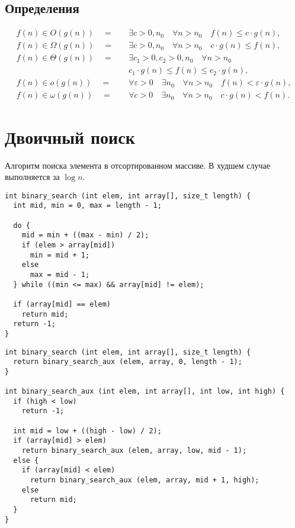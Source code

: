 \subsection{Определения}
\begin{align}
  f(n) \in O(g(n)) \quad = \quad &\exists c > 0, n_0 \quad \forall n > n_0 \quad f(n) \leq c \cdot g(n),\\
  f(n) \in \Omega(g(n)) \quad = \quad &\exists c > 0, n_0 \quad \forall n > n_0 \quad c \cdot g(n) \leq f(n),\\
  f(n) \in \Theta(g(n)) \quad = \quad &\exists c_1 > 0, c_2 > 0, n_0 \quad \forall n > n_0 \nonumber\\
                                      &c_1 \cdot g(n) \leq f(n) \leq c_2 \cdot g(n),\\
  f(n) \in o(g(n)) \quad = \quad &\forall \varepsilon > 0 \quad \exists n_0 \quad \forall n > n_0 \quad f(n) < \varepsilon \cdot g(n),\\
  f(n) \in \omega(g(n)) \quad = \quad &\forall c > 0 \quad \exists n_0 \quad \forall n > n_0 \quad c \cdot g(n) < f(n).
\end{align}

\section{Двоичный поиск}
\label{sec:binary-search}

Алгоритм поиска элемента в отсортированном массиве. В худшем случае выполняется за $\log{n}$.

\lstset{label=lst:iter-bin-seaerch,caption=Итеративный алгоритм бинарного поиска}
\begin{lstlisting}
int binary_search (int elem, int array[], size_t length) {
  int mid, min = 0, max = length - 1;

  do {
    mid = min + ((max - min) / 2);
    if (elem > array[mid])
      min = mid + 1;
    else
      max = mid - 1;
  } while ((min <= max) && array[mid] != elem);

  if (array[mid] == elem)
    return mid;
  return -1;
}
\end{lstlisting}

\lstset{label=lst:rec-bin-seaerch,caption=Рекурсивный алгоритм бинарного поиска}
\begin{lstlisting}
int binary_search (int elem, int array[], size_t length) {
  return binary_search_aux (elem, array, 0, length - 1);
}

int binary_search_aux (int elem, int array[], int low, int high) {
  if (high < low)
    return -1;

  int mid = low + ((high - low) / 2);
  if (array[mid] > elem)
    return binary_search_aux (elem, array, low, mid - 1);
  else {
    if (array[mid] < elem)
      return binary_search_aux (elem, array, mid + 1, high);
    else
      return mid;
  }
}
\end{lstlisting}


